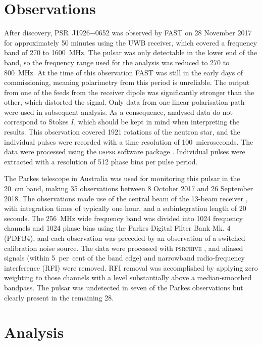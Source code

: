 \section{Observations}
\label{sec: J1926 - observations}
After discovery, PSR~J1926$-$0652 was observed by FAST on 28 November 2017 for approximately 50 minutes using the UWB receiver, which covered a frequency band of 270 to 1600~MHz. The pulsar was only detectable in the lower end of the band, so the frequency range used for the analysis was reduced to 270 to 800~MHz. At the time of this observation FAST was still in the early days of commissioning, meaning polarimetry from this period is unreliable. The output from one of the feeds from the receiver dipole was significantly stronger than the other, which distorted the signal. Only data from one linear polarisation path were used in subsequent analysis. As a consequence, analysed data do not correspond to Stokes $I$, which should be kept in mind when interpreting the results. This observation covered 1921 rotations of the neutron star, and the individual pulses were recorded with a time resolution of 100~microseconds. The data were processed using the \textsc{dspsr} software package \citep{SBxx2011}. Individual pulses were extracted with a resolution of 512 phase bins per pulse period.

The Parkes telescope in Australia was used for monitoring this pulsar in the 20~cm band, making 35 observations between 8 October 2017 and 26 September 2018. The observations made use of the central beam of the 13-beam receiver \citep{SWB+1996}, with integration times of typically one hour, and a subintegration length of 20 seconds. The 256~MHz wide frequency band was divided into 1024 frequency channels and 1024 phase bins using the Parkes Digital Filter Bank Mk. 4 (PDFB4), and each observation was preceded by an observation of a switched calibration noise source. The data were processed with \textsc{psrchive} \citep{HSMx2004}, and aliased signals (within 5~per~cent of the band edge) and narrowband radio-frequency interference (RFI) were removed. RFI removal was accomplished by applying zero weighting to those channels with a level substantially above a median-smoothed bandpass. The pulsar was undetected in seven of the Parkes observations but clearly present in the remaining 28.

\section{Analysis}
\label{sec: J1926 - analysis}

